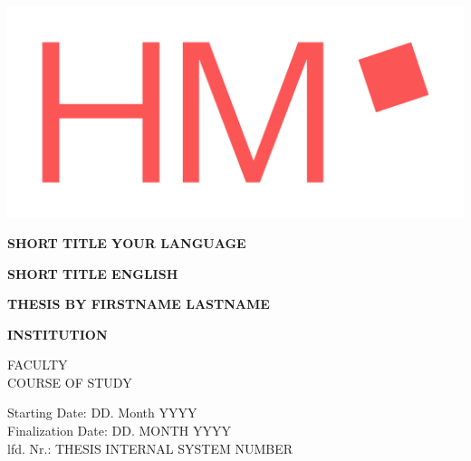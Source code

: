 \documentclass[../Main/main.tex]{subfiles}
\begin{document}
\begin{center}
	\vspace{1cm}

	\includegraphics[width=\textwidth]{../media/HM_Logo_RGB.png}

	\vspace{0.8cm}
	\textbf{SHORT TITLE YOUR LANGUAGE}

	\vspace{0.8cm}
	\textbf{SHORT TITLE ENGLISH}

	\vspace{0.8cm}
	\textbf{THESIS BY FIRSTNAME LASTNAME}

	\vspace{3cm}

	\vfill
	\textbf{INSTITUTION}

	FACULTY\\
	COURSE OF STUDY
	\vspace{1.5cm}

	Starting Date: DD. Month YYYY\\
	Finalization Date: DD. MONTH YYYY\\
	lfd. Nr.: THESIS INTERNAL SYSTEM NUMBER\\

\end{center}

\clearpage
\end{document}

